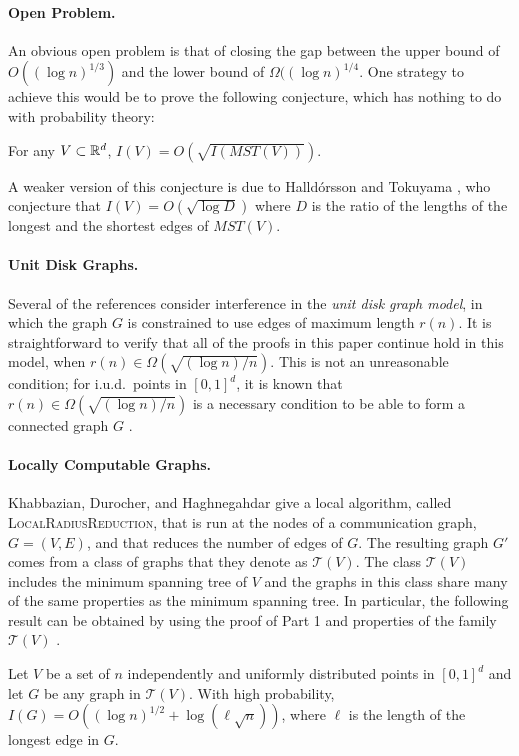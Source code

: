 \documentclass{patmorin}
\newcommand{\mst}{\mathit{MST}}
\begin{document}
\paragraph{Open Problem.}
An obvious open problem is that of closing the gap between the upper bound
of $O((\log n)^{1/3})$ and the lower bound of $\Omega((\log n)^{1/4}$.
One strategy to achieve this would be to prove the following conjecture,
which has nothing to do with probability theory:
\begin{conj}
  For any $V\subset\mathbb{R}^d$, $I(V) = O(\sqrt{I(\mst(V))})$.
\end{conj}
A weaker version of this conjecture is due to Halld\'orsson and Tokuyama
\cite{ht08}, who conjecture that $I(V)=O(\sqrt{\log D})$ where $D$ is the
ratio of the lengths of the longest and the shortest edges of $\mst(V)$.

\paragraph{Unit Disk Graphs.}
Several of the references consider interference in the \emph{unit
disk graph model}, in which the graph $G$ is constrained to use
edges of maximum length $r(n)$.  It is straightforward to verify
that all of the proofs in this paper continue hold in this model,
when $r(n)\in\Omega(\sqrt{(\log n)/n})$.  This is not an unreasonable
condition; for i.u.d.\ points in $[0,1]^d$, it is known that
$r(n)\in\Omega(\sqrt{(\log n)/n})$ is a necessary condition to be able to
form a connected graph $G$ \cite{p97}.

\paragraph{Locally Computable Graphs.}
Khabbazian, Durocher, and Haghnegahdar \cite{kdh11} give a local
algorithm, called \textsc{LocalRadiusReduction}, that is run at the nodes
of a communication graph, $G=(V,E)$, and that reduces the number of edges
of $G$.  The resulting graph $G'$ comes from a class of graphs that
they denote as $\mathcal{T}(V)$.  The class $\mathcal{T}(V)$ includes
the minimum spanning tree of $V$ and the graphs in this class share
many of the same properties as the minimum spanning tree.  In particular,
the following result can be obtained by using the proof of  Part 1 and properties of the family $\mathcal{T}(V)$ \cite[Theorem~3]{kdh11}.

\setcounter{thm}{2}
\begin{thm}
  Let $V$ be a set of $n$ independently and uniformly distributed
  points in $[0,1]^d$ and let $G$ be any graph in $\mathcal{T}(V)$.
  With high probability, $I(G)=O((\log n)^{1/2}+\log (\ell\sqrt{n}))$,
  where $\ell$ is the length of the longest edge in $G$.
\end{thm}
\end{document}
